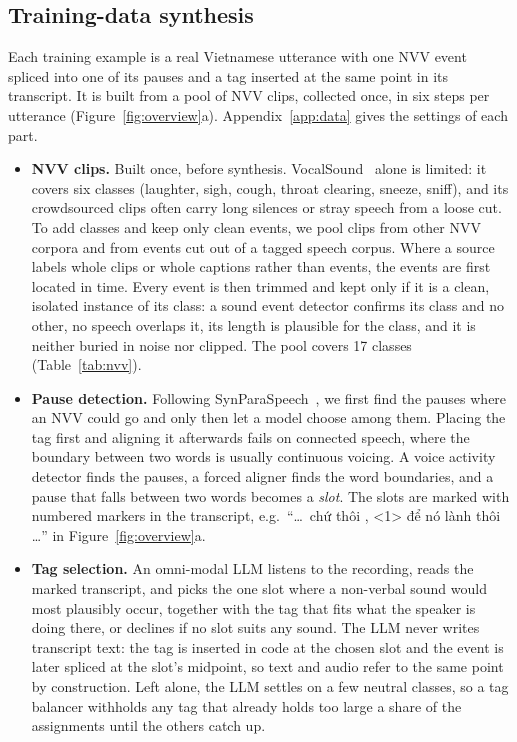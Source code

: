 \documentclass{article} %
\newcommand{\viet}[1]{{\fontencoding{T5}\selectfont #1}}
\begin{document}
\subsection{Training-data synthesis}\label{sec:data}
Each training example is a real Vietnamese utterance with one NVV event spliced into one of its
pauses and a tag inserted at the same point in its transcript. It is built from a pool of NVV
clips, collected once, in six steps per utterance (Figure~\ref{fig:overview}a).
Appendix~\ref{app:data} gives the settings of each part.

\begin{itemize}
\item \textbf{NVV clips.} Built once, before synthesis. VocalSound~\citep{vocalsound} alone is
limited: it covers six classes
(laughter, sigh, cough, throat clearing, sneeze, sniff), and its crowdsourced clips often carry
long silences or stray speech from a loose cut. To add classes and keep only clean events, we
pool clips from other NVV corpora and from events cut out of a tagged speech corpus. Where a
source labels whole clips or whole captions
rather than events, the events are first located in time. Every event is then trimmed and kept
only if it is a clean, isolated instance of its class: a sound event detector confirms its class
and no other, no speech overlaps it, its length is plausible for the class, and it is neither
buried in noise nor clipped. The pool covers 17 classes (Table~\ref{tab:nvv}).

\item \textbf{Pause detection.} Following SynParaSpeech~\citep{synparaspeech}, we first find the
pauses where an NVV could go and only then let a model choose among them. Placing the tag first
and aligning it afterwards fails on connected speech, where the boundary between two words is
usually continuous voicing. A voice activity detector finds the pauses, a forced aligner finds
the word boundaries, and a pause that falls between two words becomes a \emph{slot}. The slots
are marked with numbered markers in the transcript, e.g.\
``\viet{\ldots\ chứ thôi , <1> để nó lành thôi \ldots}'' in Figure~\ref{fig:overview}a.

\item \textbf{Tag selection.} An omni-modal LLM listens to the recording, reads the marked
transcript, and picks the one slot where a non-verbal sound would most plausibly occur,
together with the tag that fits what the speaker is doing there, or declines if no slot suits
any sound. The LLM never writes transcript text: the tag is inserted in code at the chosen slot
and the event is later spliced at the slot's midpoint, so text and audio refer to the same point
by construction. Left alone, the LLM settles on a few neutral classes, so a tag balancer
withholds any tag that already holds too large a share of the assignments until the others
catch up.


\end{itemize}
\end{document}
